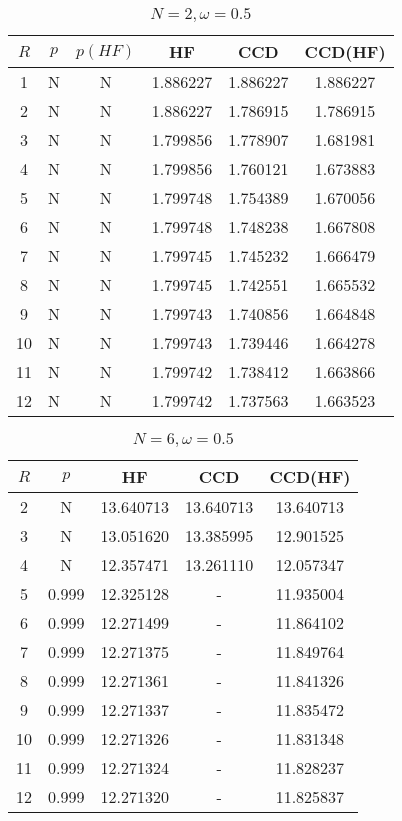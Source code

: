 \begin{table}[H]
    \centering
    \caption{$N = 2, \omega = 0.5$}
    \begin{tabular}{cccccc}
    \toprule
    $R$ & $p$ & $p(HF)$ & HF & CCD & CCD(HF) \\
    \midrule
    1 & N & N & 1.886227 & 1.886227 & 1.886227 \\
    2 & N & N & 1.886227 & 1.786915 & 1.786915 \\
    3 & N & N & 1.799856 & 1.778907 & 1.681981 \\
    4 & N & N & 1.799856 & 1.760121 & 1.673883 \\
    5 & N & N & 1.799748 & 1.754389 & 1.670056 \\
    6 & N & N & 1.799748 & 1.748238 & 1.667808 \\
    7 & N & N & 1.799745 & 1.745232 & 1.666479 \\
    8 & N & N & 1.799745 & 1.742551 & 1.665532 \\
    9 & N & N & 1.799743 & 1.740856 & 1.664848 \\
    10 & N & N & 1.799743 & 1.739446 & 1.664278 \\
    11 & N & N & 1.799742 & 1.738412 & 1.663866 \\
    12 & N & N & 1.799742 & 1.737563 & 1.663523 \\
    \bottomrule
    \end{tabular}
\end{table}
    
    

\begin{table}[H]
    \centering
    \caption{$N = 6, \omega = 0.5$}
    \begin{tabular}{ccccc}
    \toprule
    $R$ & $p$ & HF & CCD & CCD(HF) \\
    \midrule
    2 & N & 13.640713 & 13.640713 & 13.640713 \\
    3 & N & 13.051620 & 13.385995 & 12.901525 \\
    4 & N & 12.357471 & 13.261110 & 12.057347 \\
    5 & 0.999 & 12.325128 & - & 11.935004 \\
    6 & 0.999 & 12.271499 & - & 11.864102 \\
    7 & 0.999 & 12.271375 & - & 11.849764 \\
    8 & 0.999 & 12.271361 & - & 11.841326 \\
    9 & 0.999 & 12.271337 & - & 11.835472 \\
    10 & 0.999 & 12.271326 & - & 11.831348 \\
    11 & 0.999 & 12.271324 & - & 11.828237 \\
    12 & 0.999 & 12.271320 & - & 11.825837 \\
    \bottomrule
    \end{tabular}
\end{table}

